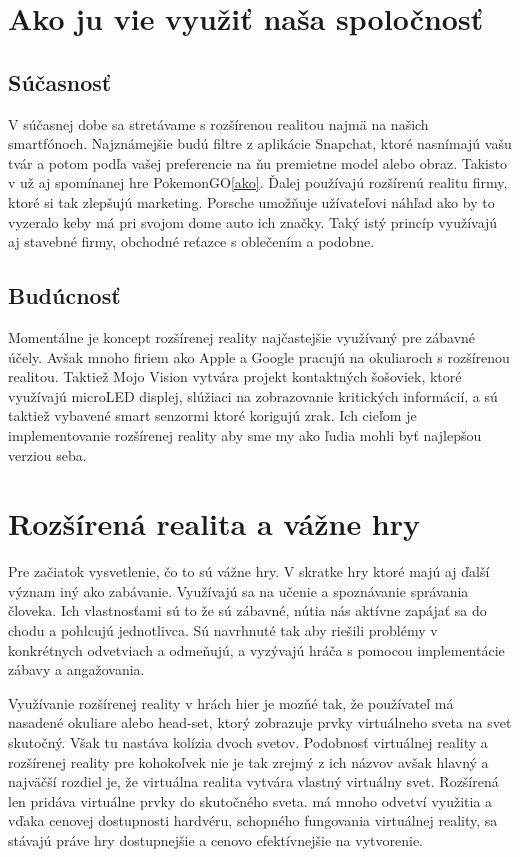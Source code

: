 \documentclass[10pt,twoside,a4paper]{article}
\begin{document}
\section{Ako ju vie využiť naša spoločnosť} \label{vyuzitie}
\subsection{Súčasnosť}\label{vyuzitie:suc}
\par V súčasnej dobe sa stretávame s rozšírenou realitou najmä na našich smartfónoch. Najznámejšie budú filtre z aplikácie Snapchat, ktoré nasnímajú vašu tvár a potom podľa vašej preferencie na ňu premietne model alebo obraz. Takisto v už aj spomínanej hre PokemonGO\ref{ako}. Ďalej používajú rozšírenú realitu firmy, ktoré si tak zlepšujú marketing. Porsche umožňuje užívateľovi náhľad ako by to vyzeralo keby má pri svojom dome auto ich značky. Taký istý princíp využívajú aj stavebné firmy, obchodné reťazce s oblečením a podobne.

\subsection{Budúcnosť} \label{vyuzitie:bud}
\par Momentálne je koncept rozšírenej reality najčastejšie využívaný pre zábavné účely. Avšak mnoho firiem ako Apple a Google pracujú na okuliaroch s rozšírenou realitou. Taktiež Mojo Vision vytvára projekt kontaktných šošoviek, ktoré využívajú microLED displej, slúžiaci na zobrazovanie kritických informácií, a sú taktiež vybavené smart senzormi ktoré korigujú zrak. Ich cieľom je implementovanie rozšírenej reality aby sme my ako ľudia mohli byť najlepšou verziou seba.~\cite{Mojo}

\section{Rozšírená realita a vážne hry} \label{vz}
\par Pre začiatok vysvetlenie, čo to sú vážne hry. V skratke hry ktoré majú aj ďalší význam iný ako zabávanie. Využívajú sa na učenie a spoznávanie správania človeka. Ich vlastnosťami sú to že sú zábavné, nútia nás aktívne zapájať sa do chodu a pohlcujú jednotlivca. Sú navrhnuté tak aby riešili problémy v konkrétnych odvetviach a odmeňujú, a vyzývajú hráča s pomocou implementácie zábavy a angažovania. \par Využívanie rozšírenej reality v hrách hier je mozňé tak, že používateľ má nasadené okuliare alebo head-set, ktorý zobrazuje prvky virtuálneho sveta na svet skutočný. Však tu nastáva kolízia dvoch svetov. Podobnosť virtuálnej reality a rozšírenej reality pre kohokoľvek nie je tak zrejmý z ich názvov avšak hlavný a najväčší rozdiel je, že virtuálna realita vytvára vlastný virtuálny svet. Rozšírená len pridáva virtuálne prvky do skutočného sveta. má mnoho odvetví využitia a vďaka cenovej dostupnosti hardvéru, schopného fungovania virtuálnej reality, sa stávajú práve hry dostupnejšie a cenovo efektívnejšie na vytvorenie.
\end{document}
